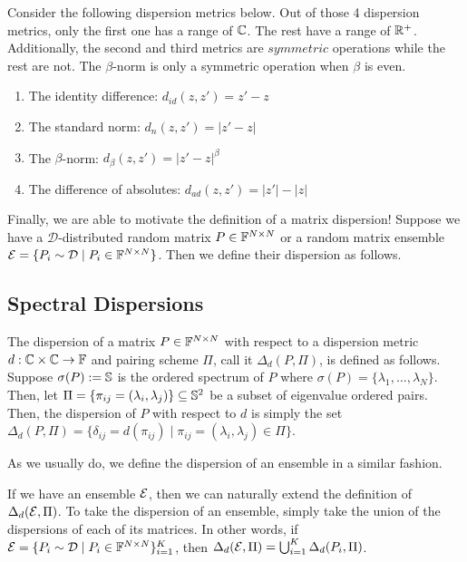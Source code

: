 Consider the following dispersion metrics below. Out of those 4 dispersion metrics, only the first one has a range of $\Cc$. The rest have a range of $\R^+$. Additionally, the second and third metrics are $\textit{symmetric}$ operations while the rest are not. The $\beta$-norm is only a symmetric operation when $\beta$ is even.

\begin{enumerate}
\item The identity difference: $d_{id}(z,z') = z' - z$
\item The standard norm: $d_{n}(z,z') = |z' - z|$
\item The $\beta$-norm: $d_\beta(z,z') = |z' - z|^\beta$
\item The difference of absolutes: $d_{ad}(z,z') = |z'| - |z|$
\end{enumerate}

Finally, we are able to motivate the definition of a matrix dispersion! Suppose we have a $\mathcal{D}$-distributed random matrix $P \in \F^{N \times N}$ or a random matrix ensemble $\Ens = \{P_i \sim \mathcal{D} \mid P_i \in \F^{N \times N}\}$. Then we define their dispersion as follows. 


\subsection{Spectral Dispersions}

\begin{definition}[Dispersion]
The dispersion of a matrix $P \in \F^{N \times N}$ with respect to a dispersion metric $d: \Cc \times \Cc \to \F$ and pairing scheme $\Pi$, call it $\Delta_d(P, \Pi)$, is defined as follows. Suppose $\sigma(P) := \S$ is the ordered spectrum of $P$ where $\sigma(P) = \{\lambda_1, \dots, \lambda_N\}$. Then, let $\Pi = \{\pi_{ij} = (\lambda_i,\lambda_j) \} \subseteq \S^2$ be a subset of eigenvalue ordered pairs. Then, the dispersion of $P$ with respect to $d$ is simply the set $\Delta_d(P, \Pi)=\{\delta_{ij} = d(\pi_{ij}) \mid \pi_{ij} = (\lambda_i,\lambda_j) \in \Pi\}$.
\end{definition}

As we usually do, we define the dispersion of an ensemble in a similar fashion. 

\begin{definition}
If we have an ensemble $\Ens$, then we can naturally extend the definition of $\Delta_d(\Ens, \Pi)$. To take the dispersion of an ensemble, simply take the union of the dispersions of each of its matrices. In other words, if $\Ens = \{P_i \sim \mathcal{D} \mid P_i \in \F^{N \times N}\}_{i = 1}^K$, then $\Delta_d(\Ens, \Pi) = \bigcup_{i=1}^K \Delta_d(P_i, \Pi)$.
\end{definition}


